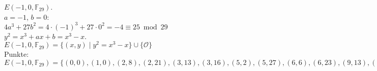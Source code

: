 \documentclass[a4paper, 10pt]{scrartcl}
\begin{document}
$E(-1, 0, \mathbb{F}_{29})$.\\

$a = -1$, $b = 0$:\\
$4a^{3} + 27b^{2} = 4\cdot (-1)^{3} + 27\cdot 0^{2} = -4 \equiv 25\bmod 29$\\
$y^{2} = x^{3} + ax + b = x^{3} - x$.\\

$E(-1, 0, \mathbb{F}_{29}) = \{ (x, y)\mid y^{2} = x^{3} - x \}\cup \{ \mathcal{O} \}$\\

Punkte:\\
$
E(-1, 0, \mathbb{F}_{29}) = \{
(0, 0),
(1, 0),
(2, 8),
(2, 21),
(3, 13),
(3, 16),
(5, 2),
(5, 27),
(6, 6),
(6, 23),
(9, 13),
(9, 16),
(10, 2),
(10, 27),
(12, 11),
(12, 18),
(13, 3),
(13, 26),
(14, 2),
(14, 27),
(15, 5),
(15, 24),
(16, 7),
(16, 22),
(17, 13),
(17, 16),
(19, 5),
(19, 24),
(20, 11),
(20, 18),
(23, 14),
(23, 15),
(24, 5),
(24, 24),
(26, 11),
(26, 18),
(27, 9),
(27, 20),
(28, 0),
\mathcal{O} \}
$\\
\end{document}
